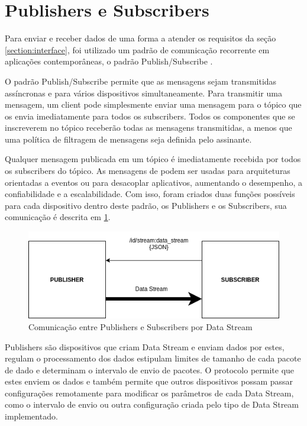 \section{Publishers e Subscribers}
\label{section:publishers_subscribers}

Para enviar e receber dados de uma forma a atender os requisitos da seção \ref{section:interface}, foi utilizado um padrão de comunicação recorrente em aplicações contemporâneas, o padrão Publish/Subscribe \cite{amazon:pub_sub}.

O padrão Publish/Subscribe permite que as mensagens sejam transmitidas assíncronas e para vários dispositivos simultaneamente. Para transmitir uma mensagem, um client pode simplesmente enviar uma mensagem para o tópico que os envia imediatamente para todos os subscribers. Todos os componentes que se inscreverem no tópico receberão todas as mensagens transmitidas, a menos que uma política de filtragem de mensagens seja definida pelo assinante.

Qualquer mensagem publicada em um tópico é imediatamente recebida por todos os subscribers do tópico. As mensagens de podem ser usadas para arquiteturas orientadas a eventos ou para desacoplar aplicativos, aumentando  o desempenho, a confiabilidade e a escalabilidade. Com isso, foram criados duas funções possíveis para cada dispositivo dentro deste padrão, os Publishers e os Subscribers, sua comunicação é descrita em \ref{fig:3.2.0/pub_sub}.

\begin{figure}[h!]
\label{fig:3.2.0/pub_sub}
\centering
\includegraphics[width=12cm]{./02_Capitulos/02_Cap3/figures/publisher-subscriber_comm}
\caption{Comunicação entre Publishers e Subscribers por Data Stream}
\label{fig:3.2.0/pub_sub}
\end{figure}


Publishers são dispositivos que criam Data Stream  e enviam dados por estes, regulam o processamento dos dados estipulam limites de tamanho de cada pacote de dado e determinam o intervalo de envio de pacotes. O protocolo permite que estes enviem os dados e também permite que outros dispositivos possam passar configurações remotamente para modificar os parâmetros de cada Data Stream, como o intervalo de envio ou outra configuração criada pelo tipo de Data Stream implementado. 

